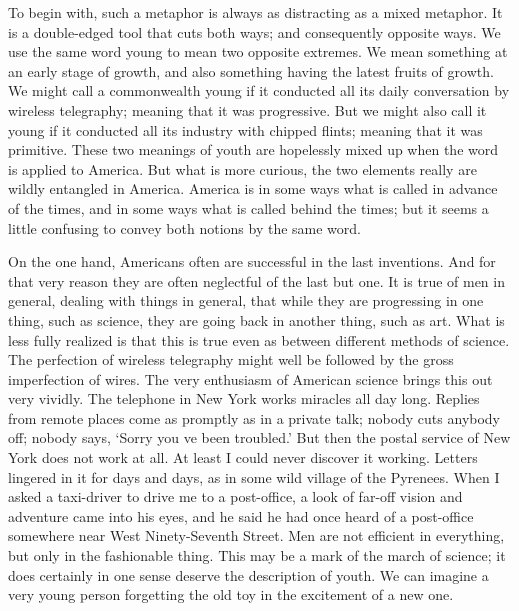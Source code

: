 \documentclass{book}
\begin{document}
To begin with, such a metaphor is always as distracting as a mixed metaphor. It is a double-edged tool that cuts both ways; and consequently opposite ways. We use the same word young to mean two opposite extremes. We mean something at an early stage of growth, and also something having the latest fruits of growth. We might call a commonwealth young if it conducted all its daily conversation by wireless telegraphy; meaning that it was progressive. But we might also call it young if it conducted all its industry with chipped flints; meaning that it was primitive. These two meanings of youth are hopelessly mixed up when the word is applied to America. But what is more curious, the two elements really are wildly entangled in America. America is in some ways what is called in advance of the times, and in some ways what is called behind the times; but it seems a little confusing to convey both notions by the same word.

On the one hand, Americans often are successful in the last inventions. And for that very reason they are often neglectful of the last but one. It is true of men in general, dealing with things in general, that while they are progressing in one thing, such as science, they are going back in another thing, such as art. What is less fully realized is that this is true even as between different methods of science. The perfection of wireless telegraphy might well be followed by the gross imperfection of wires. The very enthusiasm of American science brings this out very vividly. The telephone in New York works miracles all day long. Replies from remote places come as promptly as in a private talk; nobody cuts anybody off; nobody says, ‘Sorry you ve been troubled.’ But then the postal service of New York does not work at all. At least I could never discover it working. Letters lingered in it for days and days, as in some wild village of the Pyrenees. When I asked a taxi-driver to drive me to a post-office, a look of far-off vision and adventure came into his eyes, and he said he had once heard of a post-office somewhere near West Ninety-Seventh Street. Men are not efficient in everything, but only in the fashionable thing. This may be a mark of the march of science; it does certainly in one sense deserve the description of youth. We can imagine a very young person forgetting the old toy in the excitement of a new one.
\end{document}
